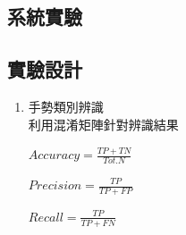 \documentclass[12pt,a4paper]{report}
\begin{document}
\begin{CJK*}{UTF8}{bkai}
    \chapter{系統實驗}
    \section{實驗設計}

    \begin{enumerate}
        \item 手勢類別辨識\\
              利用混淆矩陣針對辨識結果

              \begin{Large}
                  \begin{math}
                      Accuracy =\frac{TP+TN}{Tot.N}
                  \end{math}

                  \begin{math}
                      Precision =\frac{TP}{TP+FP}
                  \end{math}

                  \begin{math}
                      Recall =\frac{TP}{TP+FN}
                  \end{math}


\end{Large}
\end{enumerate}
\end{CJK*}
\end{document}
